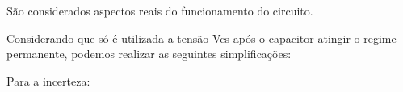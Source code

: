 \documentclass{article}
\begin{document}
\begin{Maple Normal}{
\begin{Maple Normal}{
São considerados aspectos reais do funcionamento do circuito.}\end{Maple Normal}

}\end{Maple Normal}

\begin{Maple Normal}{
\begin{Maple Normal}{
}\end{Maple Normal}
}\end{Maple Normal}
\begin{Maple Normal}{
\begin{Maple Normal}{
}\end{Maple Normal}
}\end{Maple Normal}
\begin{Maple Normal}{
\begin{Maple Normal}{
Considerando que só é utilizada a tensão Vcs após o capacitor atingir o regime permanente, podemos realizar as seguintes simplificações:}\end{Maple Normal}

}\end{Maple Normal}

\begin{Maple Normal}{
\begin{Maple Normal}{
}\end{Maple Normal}
}\end{Maple Normal}
\begin{Maple Normal}{
\begin{Maple Normal}{
}\end{Maple Normal}
}\end{Maple Normal}
\begin{Maple Normal}{
\begin{Maple Normal}{
Para a incerteza:}\end{Maple Normal}

}\end{Maple Normal}
\end{document}
